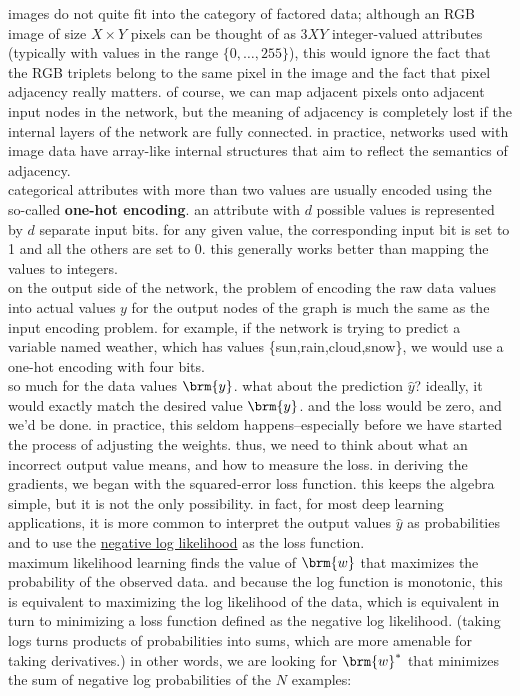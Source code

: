 \documentclass[a4paper,12pt]{article}
\begin{document}
images do not quite fit into the category of factored data; although an RGB image of size \(X \times Y\) pixels can be thought of as \(3XY\) integer-valued attributes (typically with values in the range \(\{0,\dots,255\}\)), this would ignore the fact that the RGB triplets belong to the same pixel in the image and the fact that pixel adjacency really matters. of course, we can map adjacent pixels onto adjacent input nodes in the network, but the meaning of adjacency is completely lost if the internal layers of the network are fully connected. in practice, networks used with image data have array-like internal structures that aim to reflect the semantics of adjacency.\\
categorical attributes with more than two values are usually encoded using the so-called \textbf{one-hot encoding}. an attribute with \(d\) possible values is represented by \(d\) separate input bits. for any given value, the corresponding input bit is set to 1 and all the others are set to 0. this generally works better than mapping the values to integers.\\
on the output side of the network, the problem of encoding the raw data values into actual values \(y\) for the output nodes of the graph is much the same as the input encoding problem. for example, if the network is trying to predict a variable named weather, which has values \{sun,rain,cloud,snow\}, we would use a one-hot encoding with four bits.\\
so much for the data values \(\brm{y}\). what about the prediction \(\hat  y\)? ideally, it would exactly match the desired value \(\brm{y}\). and the loss would be zero, and we'd be done. in practice, this seldom happens--especially before we have started the process of adjusting the weights. thus, we need to think about what an incorrect output value means, and how to measure the loss. in deriving the gradients, we began with the squared-error loss function. this keeps the algebra simple, but it is not the only possibility. in fact, for most deep learning applications, it is more common to interpret the output values \(\hat y\) as probabilities and to use the \href{20230503182055-negative_log_likelihood.org}{negative log likelihood} as the loss function.\\
maximum likelihood learning finds the value of \(\brm{w}\) that maximizes the probability of the observed data. and because the log function is monotonic, this is equivalent to maximizing the log likelihood of the data, which is equivalent in turn to minimizing a loss function defined as the negative log likelihood. (taking logs turns products of probabilities into sums, which are more amenable for taking derivatives.) in other words, we are looking for \(\brm{w}^*\) that minimizes the sum of negative log probabilities of the \(N\) examples:\\
\end{document}
